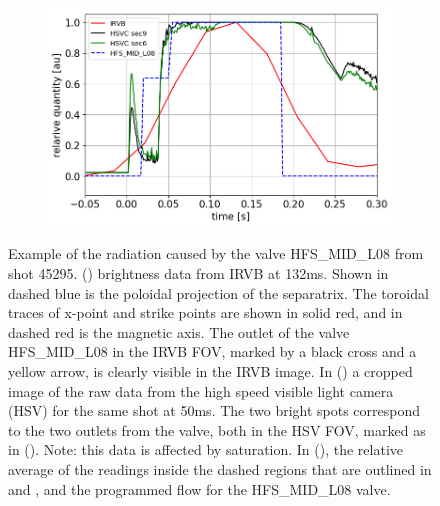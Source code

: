 \begin{figure}
\begin{subfigure}{0.48\linewidth}
        \vspace*{-6mm}
        {\color{white}\caption{\phantom{ }}\label{fig:MAST-U_HFS_MID_L08_2}}
     \end{subfigure}
     \begin{subfigure}{0.6\linewidth}
        \vspace*{2mm}
        \centering
        \includegraphics[width=\textwidth,trim={5 0 0 0},clip]{Chapters/chapter2/figs/45295_for_paper2.png}
        \vspace*{-6mm}
        {\color{white}\caption{\phantom{ }}\label{fig:MAST-U_HFS_MID_L08_3}}
     \end{subfigure}
        \vspace*{+5mm}
        \caption{Example of the radiation caused by the valve HFS\_MID\_L08 from shot 45295. () brightness data from IRVB at 132ms. Shown in dashed blue is the poloidal projection of the separatrix. The toroidal traces of x-point and strike points are shown in solid red, and in dashed red is the magnetic axis. The outlet of the valve HFS\_MID\_L08 in the IRVB FOV, marked by a black cross and a yellow arrow, is clearly visible in the IRVB image. In () a cropped image of the raw data from the high speed visible light camera (HSV) for the same shot at 50ms. The two bright spots correspond to the two outlets from the valve, both in the HSV FOV, marked as in (). Note: this data is affected by saturation. In (), the relative average of the readings inside the dashed regions that are outlined in  and , and the programmed flow for the HFS\_MID\_L08 valve.}
        \label{fig:MAST-U_HFS_MID_L08}
\end{figure}

